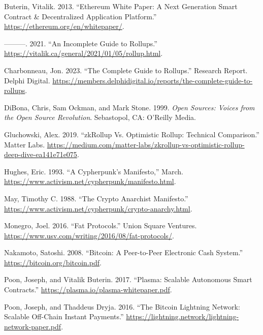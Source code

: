 \documentclass[
  letterpaper,
  DIV=11,
  numbers=noendperiod]{scrreprt}
\newlength{\cslhangindent}
\newenvironment{CSLReferences}[2] %
 {\begin{list}{}{%
  \setlength{\itemindent}{0pt}
  \setlength{\leftmargin}{0pt}
  \setlength{\parsep}{0pt}
  \ifodd #1
   \setlength{\leftmargin}{\cslhangindent}
   \setlength{\itemindent}{-1\cslhangindent}
  \fi
  \setlength{\itemsep}{#2\baselineskip}}}
 {\end{list}}
\begin{document}
\label{refs}
\begin{CSLReferences}{1}{0}
Buterin, Vitalik. 2013. {``Ethereum White Paper: A Next Generation Smart
Contract \& Decentralized Application Platform.''}
\url{https://ethereum.org/en/whitepaper/}.

---------. 2021. {``An Incomplete Guide to Rollups.''}
\url{https://vitalik.ca/general/2021/01/05/rollup.html}.

Charbonneau, Jon. 2023. {``The Complete Guide to Rollups.''} Research
Report. Delphi Digital.
\url{https://members.delphidigital.io/reports/the-complete-guide-to-rollups}.

DiBona, Chris, Sam Ockman, and Mark Stone. 1999. \emph{Open Sources:
Voices from the Open Source Revolution}. Sebastopol, CA: O'Reilly Media.

Gluchowski, Alex. 2019. {``zkRollup Vs. Optimistic Rollup: Technical
Comparison.''} Matter Labs.
\url{https://medium.com/matter-labs/zkrollup-vs-optimistic-rollup-deep-dive-ea141e71e075}.

Hughes, Eric. 1993. {``A Cypherpunk's Manifesto,''} March.
\url{https://www.activism.net/cypherpunk/manifesto.html}.

May, Timothy C. 1988. {``The Crypto Anarchist Manifesto.''}
\url{https://www.activism.net/cypherpunk/crypto-anarchy.html}.

Monegro, Joel. 2016. {``Fat Protocols.''} Union Square Ventures.
\url{https://www.usv.com/writing/2016/08/fat-protocols/}.

Nakamoto, Satoshi. 2008. {``Bitcoin: A Peer-to-Peer Electronic Cash
System.''} \url{https://bitcoin.org/bitcoin.pdf}.

Poon, Joseph, and Vitalik Buterin. 2017. {``Plasma: Scalable Autonomous
Smart Contracts.''} \url{https://plasma.io/plasma-whitepaper.pdf}.

Poon, Joseph, and Thaddeus Dryja. 2016. {``The Bitcoin Lightning
Network: Scalable Off-Chain Instant Payments.''}
\url{https://lightning.network/lightning-network-paper.pdf}.

\end{CSLReferences}
\end{document}
